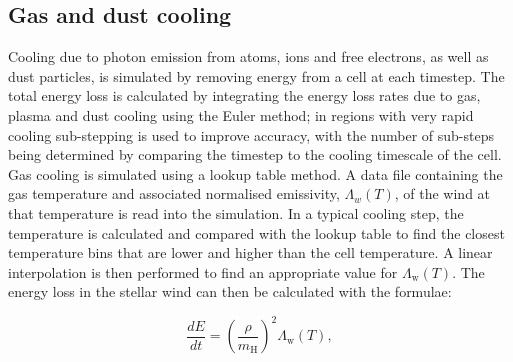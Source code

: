 \documentclass[fleqn,usenatbib]{mnras}
\begin{document}

\subsection{Gas and dust cooling}
\label{sec:gas-dust-cooling}

Cooling due to photon emission from atoms, ions and free electrons, as well as dust particles, is simulated by removing energy from a cell at each timestep.
The total energy loss is calculated by integrating the energy loss rates due to gas, plasma and dust cooling using the Euler method; in regions with very rapid cooling sub-stepping is used to improve accuracy, with the number of sub-steps being determined by comparing the timestep to the cooling timescale of the cell.
Gas cooling is simulated using a lookup table method.
A data file containing the gas temperature and associated normalised emissivity, $\Lambda_w(T)$, of the wind at that temperature is read into the simulation.
In a typical cooling step, the temperature is calculated and compared with the lookup table to find the closest temperature bins that are lower and higher than the cell temperature.
A linear interpolation is then performed to find an appropriate value for $\Lambda_\text{w} (T)$.
The energy loss in the stellar wind can then be calculated with the formulae:

\begin{equation}
  \frac{dE}{dt} = \left(\frac{\rho}{m_\text{H}}\right)^2 \Lambda_\text{w} (T),
\end{equation}
\end{document}
